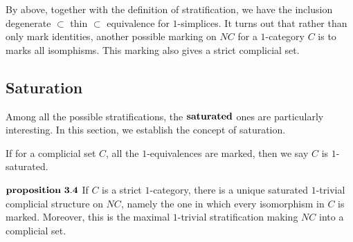 \documentclass[11pt]{article}
\begin{document}
By above, together with the definition of stratification, we have the inclusion degenerate $\subset$ thin $\subset$ equivalence for $1$-simplices. It turns out that rather than only mark identities, another possible marking on $NC$ for a $1$-category $C$ is to marks all isomphisms. This marking also gives a strict complicial set. 

\subsection{Saturation}

Among all the possible stratifications, the $\bf saturated$ ones are particularly interesting. In this section, we establish the concept of saturation.

If for a complicial set $C$, all the $1$-equivalences are marked, then we say $C$ is $1$-saturated.

$\bf proposition \ 3.4$ If $C$ is a strict $1$-category, there is a unique saturated $1$-trivial complicial structure on $NC$, namely the one in which every isomorphism in $C$ is marked. Moreover, this is the maximal $1$-trivial stratification making $NC$ into a complicial set.
\end{document}
